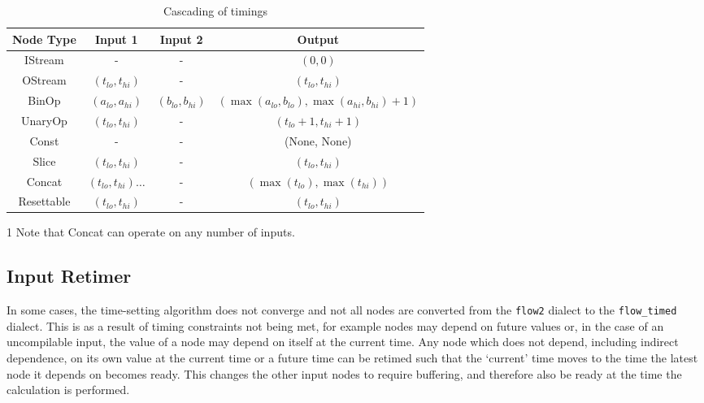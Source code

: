 \begin{table}[h]
  \centering
  \begin{threeparttable}
  \begin{tabular}{|c|c|c|c|}
    \hline
    \textbf{Node Type} & \textbf{Input 1} & \textbf{Input 2} & \textbf{Output} \\
    \hline IStream & \hyphen{} & \hyphen{} & $(0, 0)$ \\
    \hline OStream & $(t_{lo}, t_{hi})$ & \hyphen{} & $(t_{lo}, t_{hi})$ \\
    \hline BinOp & $(a_{lo}, a_{hi})$ & $(b_{lo}, b_{hi})$ & $(\max(a_{lo}, b_{lo}), \max(a_{hi}, b_{hi}) + 1)$ \\
    \hline UnaryOp & $(t_{lo}, t_{hi})$ & \hyphen{} & $(t_{lo} + 1, t_{hi} + 1)$ \\
    \hline Const & \hyphen{} & \hyphen{} & (None, None) \\
    \hline Slice & $(t_{lo}, t_{hi})$ & \hyphen{} & $(t_{lo}, t_{hi})$ \\
    \hline Concat\tnote{1} & $(t_{lo}, t_{hi})\dots$ & \hyphen{} & $(\max(t_{lo}), \max(t_{hi}))$ \\
    \hline Resettable & $(t_{lo}, t_{hi})$ & \hyphen{} & $(t_{lo}, t_{hi})$ \\
    \hline
  \end{tabular}
  \begin{tablenotes}
    \item [1] Note that Concat can operate on any number of inputs.
  \end{tablenotes}
  \end{threeparttable}
  \caption{Cascading of timings}\label{fwd.timings}
\end{table}


\subsection{Input Retimer}\label{algo.timing}
In some cases, the time-setting algorithm does not converge and not all nodes are converted from the \lstinline|flow2| dialect to the \lstinline|flow_timed| dialect. This is as a result of timing constraints not being met, for example nodes may depend on future values or, in the case of an uncompilable input, the value of a node may depend on itself at the current time. Any node which does not depend, including indirect dependence, on its own value at the current time or a future time can be retimed such that the `current' time moves to the time the latest node it depends on becomes ready. This changes the other input nodes to require buffering, and therefore also be ready at the time the calculation is performed.

